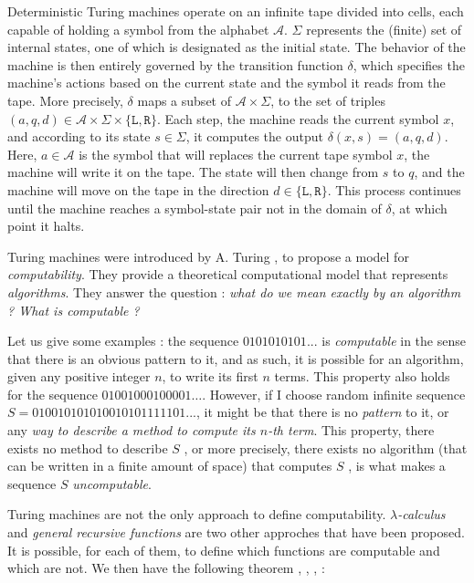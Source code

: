 Deterministic Turing machines operate on an infinite tape divided into cells, each capable of holding a symbol from the alphabet $ \mathcal A $. $ \Sigma $ represents the (finite) set of internal states, one of which is designated as the initial state. The behavior of the machine is then entirely governed by the transition function $ \delta $, which specifies the machine's actions based on the current state and the symbol it reads from the tape. More precisely, $ \delta $ maps a subset of $ \mathcal A \times \Sigma $, to the set of triples $ (a, q, d) \in \mathcal A \times \Sigma \times \{ \texttt L, \texttt R \} $. Each step, the machine reads the current symbol $ x $, and according to its state $ s \in \Sigma $, it computes the output $ \delta(x,s) = (a, q, d) $. Here, $ a \in \mathcal A $ is the symbol that will replaces the current tape symbol $ x $, the machine will write it on the tape. The state will then change from $ s $ to $ q $, and the machine will move on the tape in the direction $ d \in \{ \texttt L, \texttt R\} $. This process continues until the machine reaches a symbol-state pair not in the domain of $ \delta $, at which point it halts.

Turing machines were introduced by A. Turing \cite{turing1936}, \cite{turing1992} to propose a model for \textit{computability}. They provide a theoretical computational model that represents \textit{algorithms}. They answer the question : \textit{what do we mean exactly by an algorithm ? What is computable ?} 

Let us give some examples : the sequence $ 0101010101... $ is \textit{computable} in the sense that there is an obvious pattern to it, and as such, it is possible for an algorithm, given any positive integer $ n $, to write its first $ n $ terms. This property also holds for the sequence $ 01001000100001 \dots $. However, if I choose \og random \fg infinite sequence $ S = 010010101010010101111101... $, it might be that there is no \textit{pattern} to it, or any \textit{way to describe a method to compute its $ n $-th term}. This property, \og there exists no method to describe $ S $ \fg, or more precisely, \og there exists no algorithm (that can be written in a finite amount of space) that computes $ S $ \fg, is what makes a sequence $ S $ \textit{uncomputable}.

Turing machines are not the only approach to define computability. \textit{$ \lambda $-calculus} and \textit{general recursive functions} are two other approches that have been proposed. It is possible, for each of them, to define which functions are computable and which are not. We then have the following theorem \cite{soare1996}, \cite{church1936}, \cite{kleene1936}, \cite{turing1937} :

